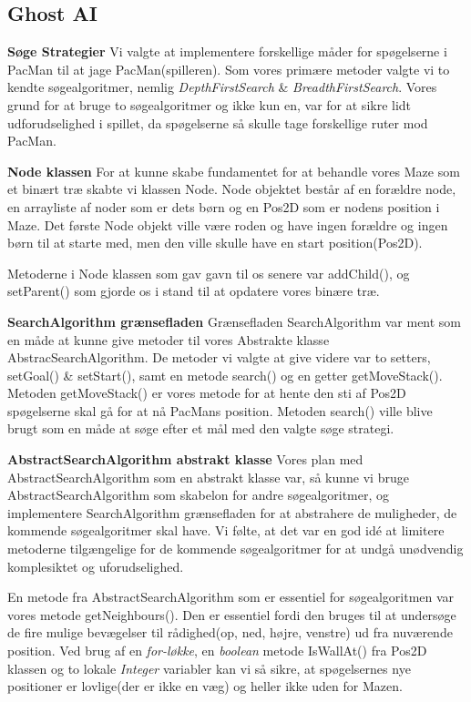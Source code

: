 \documentclass{article}
\theoremstyle{mytheoremstyle}
\theoremstyle{mytheoremstyle}
\theoremstyle{myproblemstyle}
\begin{document}
\subsection{Ghost AI}\label{sub:Ghost AI} %
\textbf{Søge Strategier}
Vi valgte at implementere forskellige måder for spøgelserne i PacMan til at jage PacMan(spilleren). 
Som vores primære metoder valgte vi to kendte søgealgoritmer, nemlig \textit{DepthFirstSearch} \& \textit{BreadthFirstSearch}. 
Vores grund for at bruge to søgealgoritmer og ikke kun en, var for at sikre lidt udforudselighed i spillet, 
da spøgelserne så skulle tage forskellige ruter mod PacMan.

\textbf{Node klassen}
For at kunne skabe fundamentet for at behandle vores Maze som et binært træ skabte vi klassen Node. 
Node objektet består af en forældre node, en arrayliste af noder som er dets børn og en Pos2D som er nodens position i Maze. 
Det første Node objekt ville være roden og have ingen forældre og ingen børn til at starte med, 
men den ville skulle have en start position(Pos2D).

Metoderne i Node klassen som gav gavn til os senere var addChild(), og setParent() som gjorde os i stand til at opdatere vores binære træ. 

\textbf{SearchAlgorithm grænsefladen} 
Grænsefladen SearchAlgorithm var ment som en måde at kunne give metoder til vores Abstrakte klasse AbstracSearchAlgorithm. 
De metoder vi valgte at give videre var to setters, setGoal() \& setStart(), samt en metode search() og en getter getMoveStack(). 
Metoden getMoveStack() er vores metode for at hente den sti af Pos2D spøgelserne skal gå for at nå PacMans position. 
Metoden search() ville blive brugt som en måde at søge efter et mål med den valgte søge strategi. 

\textbf{AbstractSearchAlgorithm abstrakt klasse}
Vores plan med AbstractSearchAlgorithm som en abstrakt klasse var, så kunne vi bruge AbstractSearchAlgorithm som skabelon for andre søgealgoritmer, og implementere SearchAlgorithm grænsefladen for at abstrahere de muligheder, de kommende søgealgoritmer skal have. Vi følte, at det var en god idé at limitere metoderne tilgængelige for de kommende søgealgoritmer for at undgå unødvendig komplesiktet og uforudselighed. 

En metode fra AbstractSearchAlgorithm som er essentiel for søgealgoritmen var vores metode getNeighbours(). Den er essentiel fordi den bruges til at undersøge de fire mulige bevægelser til rådighed(op, ned, højre, venstre) ud fra nuværende position. Ved brug af en \textit{for-løkke}, en \textit{boolean} metode IsWallAt() fra Pos2D klassen og to lokale \textit{Integer} variabler kan vi så sikre, at spøgelsernes nye positioner er lovlige(der er ikke en væg) og heller ikke uden for Mazen.
\end{document}
